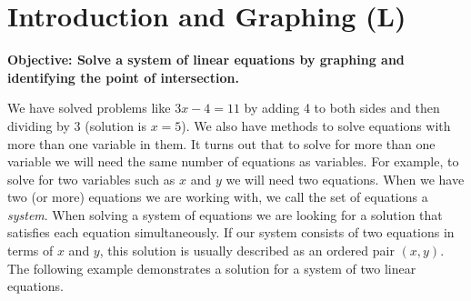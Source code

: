 \documentclass[12pt]{book}
\theoremstyle{definition}
\begin{document}
\section{Introduction and Graphing (L)}
%
{\bf Objective: Solve a system of linear equations by graphing and identifying the point of intersection.}\par
We have solved problems like $3 x - 4 = 11$ by adding 4 to both sides and then dividing by 3 (solution is $x = 5$). We also have methods to solve equations with more than one variable in them. It turns out that to solve for more than one variable we will need the same number of equations as variables. For example, to solve for two variables such as $x$ and $y$ we will need two equations. When we have two (or more) equations we are working with, we call the set of equations a {\it system}.  When solving a system of equations we are looking for a solution that satisfies each equation simultaneously. If our system consists of two equations in terms of $x$ and $y$, this solution is usually described as an ordered pair $(x, y)$. The following example demonstrates a solution for a system of two linear equations.
\end{document}

